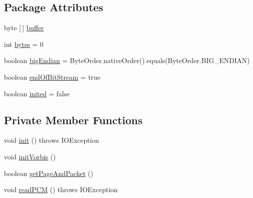 \subsection*{Package Attributes}
\begin{DoxyCompactItemize}
\item 
byte \mbox{[}$\,$\mbox{]} \mbox{\hyperlink{classorg_1_1newdawn_1_1slick_1_1openal_1_1_ogg_input_stream_a62b3d05231255de8fc23406308a658ef}{buffer}}
\item 
int \mbox{\hyperlink{classorg_1_1newdawn_1_1slick_1_1openal_1_1_ogg_input_stream_a00210211d97ece75ec471a2341e3d825}{bytes}} = 0
\item 
boolean \mbox{\hyperlink{classorg_1_1newdawn_1_1slick_1_1openal_1_1_ogg_input_stream_acc16be87f0eba75333fa75c1fa0ce8f1}{big\+Endian}} = Byte\+Order.\+native\+Order().equals(Byte\+Order.\+B\+I\+G\+\_\+\+E\+N\+D\+I\+AN)
\item 
boolean \mbox{\hyperlink{classorg_1_1newdawn_1_1slick_1_1openal_1_1_ogg_input_stream_aa15689fec2ee3d06c4afb5aae0dfca22}{end\+Of\+Bit\+Stream}} = true
\item 
boolean \mbox{\hyperlink{classorg_1_1newdawn_1_1slick_1_1openal_1_1_ogg_input_stream_aadf227eaf31d2d01b959aa96413249f3}{inited}} = false
\end{DoxyCompactItemize}
\subsection*{Private Member Functions}
\begin{DoxyCompactItemize}
\item 
void \mbox{\hyperlink{classorg_1_1newdawn_1_1slick_1_1openal_1_1_ogg_input_stream_a176448e8fa99bed81b3a3e104b2492e4}{init}} ()  throws I\+O\+Exception 
\item 
void \mbox{\hyperlink{classorg_1_1newdawn_1_1slick_1_1openal_1_1_ogg_input_stream_adb26594ad230cd2e6eb05d549859fbbb}{init\+Vorbis}} ()
\item 
boolean \mbox{\hyperlink{classorg_1_1newdawn_1_1slick_1_1openal_1_1_ogg_input_stream_a352221090700bd97613162b21b0666cc}{get\+Page\+And\+Packet}} ()
\item 
void \mbox{\hyperlink{classorg_1_1newdawn_1_1slick_1_1openal_1_1_ogg_input_stream_ac65475d928528fa2e69dee80131f29a8}{read\+P\+CM}} ()  throws I\+O\+Exception 
\end{DoxyCompactItemize}
